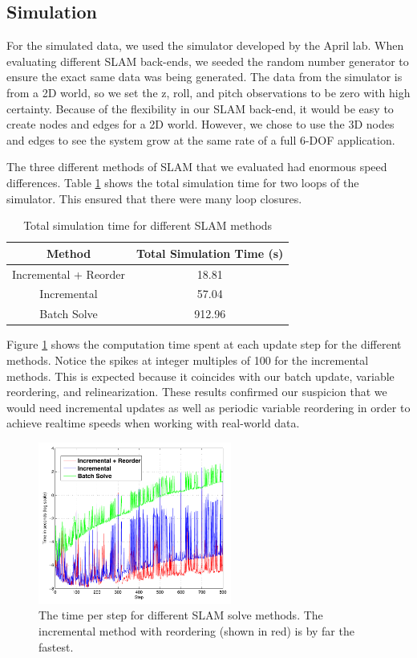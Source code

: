 \documentclass[conference]{IEEEtran}
\begin{document}
\subsection{Simulation}
\label{sub:simulation}

For the simulated data, we used the simulator developed by the April lab. When evaluating
different \ac{SLAM} back-ends, we seeded the random number generator to ensure the exact
same data was being generated. The data from the simulator is from a 2D world, so we set
the z, roll, and pitch observations to be zero with high certainty. Because of the
flexibility in our \ac{SLAM} back-end, it would be easy to create nodes and edges for a 2D
world. However, we chose to use the 3D nodes and edges to see the system grow at the same
rate of a full 6-\ac{DOF} application.

The three different methods of \ac{SLAM} that we evaluated had enormous speed differences.
Table \ref{tab:timing} shows the total simulation time for two loops of the simulator. This
ensured that there were many loop closures.

\begin{table}[!t]
\renewcommand{\arraystretch}{1.3}
\caption{Total simulation time for different \ac{SLAM} methods}
\label{tab:timing}
\centering
\begin{tabular}{|c|c|}
\hline
Method & Total Simulation Time (s) \\
\hline
Incremental + Reorder & 18.81 \\
Incremental & 57.04 \\
Batch Solve & 912.96 \\
\hline
\end{tabular}
\end{table}

Figure \ref{fig:stepTime} shows the computation time spent at each update step
for the different methods. Notice the spikes at integer multiples of 100 for the
incremental methods. This is expected because it coincides with our batch update, variable
reordering, and relinearization. These results confirmed our suspicion that we would need
incremental updates as well as periodic variable reordering in order to achieve realtime
speeds when working with real-world data.


\begin{figure}[!t]
  \centering
  \includegraphics[width=2.5in]{images/stepTimeResults}
  \caption{The time per step for different \ac{SLAM} solve methods.  The incremental
    method with reordering (shown in red) is by far the fastest.}
  \label{fig:stepTime}
\end{figure}
\end{document}
